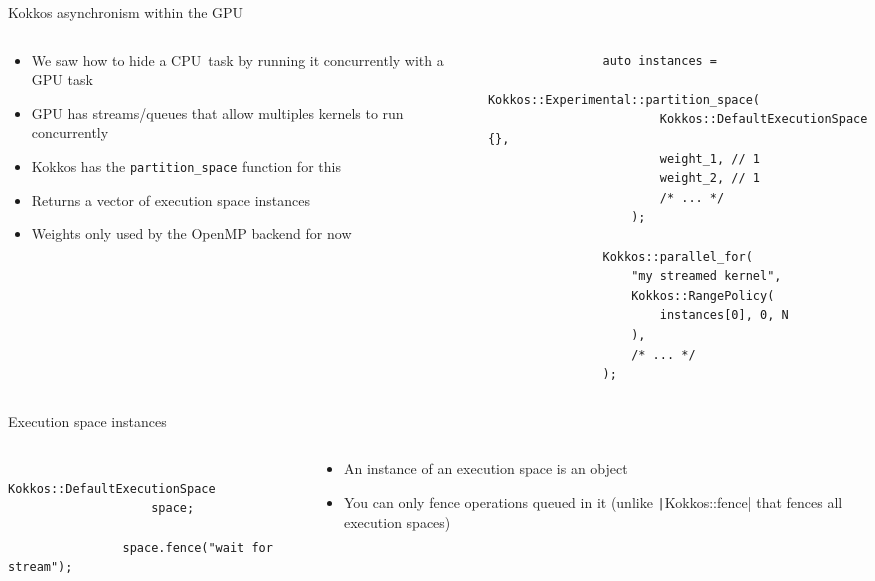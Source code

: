\documentclass[
    aspectratio=169,
]{beamer}
\begin{document}
\begin{frame}[fragile]{Kokkos asynchronism within the GPU}
    \begin{columns}
        \begin{column}{0.4\linewidth}
            \begin{itemize}
                \item We saw how to hide a CPU task by running it concurrently with a GPU task
                \item GPU has streams/queues that allow multiples kernels to run concurrently
                \item Kokkos has the \texttt{partition\_space} function for this
                \item Returns a vector of execution space instances
                \item Weights only used by the OpenMP backend for now
            \end{itemize}
        \end{column}
        \begin{column}{0.6\linewidth}
            \begin{verbatim}
                auto instances =
                    Kokkos::Experimental::partition_space(
                        Kokkos::DefaultExecutionSpace {},
                        weight_1, // 1
                        weight_2, // 1
                        /* ... */
                    );

                Kokkos::parallel_for(
                    "my streamed kernel",
                    Kokkos::RangePolicy(
                        instances[0], 0, N
                    ),
                    /* ... */
                );
            \end{verbatim}
        \end{column}
    \end{columns}
\end{frame}

\begin{frame}[fragile]{Execution space instances}
    \begin{columns}
        \begin{column}{0.5\linewidth}
            \begin{verbatim}
                Kokkos::DefaultExecutionSpace
                    space;

                space.fence("wait for stream");
            \end{verbatim}
        \end{column}
        \begin{column}{0.5\linewidth}
            \begin{itemize}
                \item An instance of an execution space is an object
                \item You can only fence operations queued in it (unlike \texttt|Kokkos::fence| that fences all execution spaces)
            \end{itemize}
        \end{column}
    \end{columns}
\end{frame}
\end{document}
